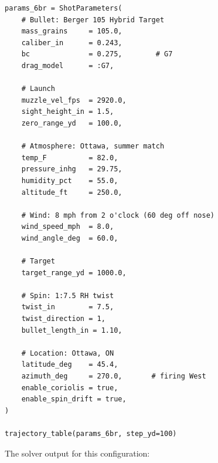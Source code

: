 \documentclass[11pt,twoside,openright]{report}
\begin{document}
\begin{lstlisting}[caption={6mm BR complete trajectory example},label={lst:6br_example}]
params_6br = ShotParameters(
    # Bullet: Berger 105 Hybrid Target
    mass_grains     = 105.0,
    caliber_in      = 0.243,
    bc              = 0.275,        # G7
    drag_model      = :G7,

    # Launch
    muzzle_vel_fps  = 2920.0,
    sight_height_in = 1.5,
    zero_range_yd   = 100.0,

    # Atmosphere: Ottawa, summer match
    temp_F          = 82.0,
    pressure_inhg   = 29.75,
    humidity_pct    = 55.0,
    altitude_ft     = 250.0,

    # Wind: 8 mph from 2 o'clock (60 deg off nose)
    wind_speed_mph  = 8.0,
    wind_angle_deg  = 60.0,

    # Target
    target_range_yd = 1000.0,

    # Spin: 1:7.5 RH twist
    twist_in        = 7.5,
    twist_direction = 1,
    bullet_length_in = 1.10,

    # Location: Ottawa, ON
    latitude_deg    = 45.4,
    azimuth_deg     = 270.0,       # firing West
    enable_coriolis = true,
    enable_spin_drift = true,
)

trajectory_table(params_6br, step_yd=100)
\end{lstlisting}

The solver output for this configuration:
\end{document}
